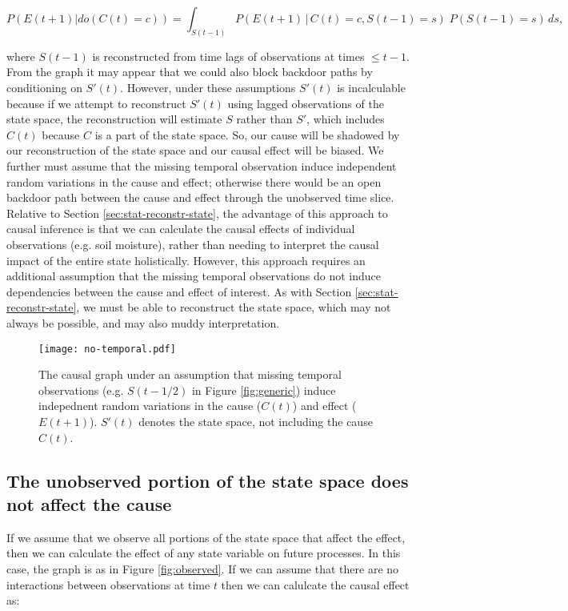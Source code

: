 \documentclass[12pt]{article}
\begin{document}
\begin{equation}
  P(E(t+1)| do(C(t)=c)) = \int_{S(t-1)} P(E(t+1) \, | \, C(t)=c,
  S(t-1) = s
  )\; P(S(t-1)=s) \, d s,
\end{equation}

where $S(t-1)$ is reconstructed from time lags of observations at
times $\leq t-1$. From the graph it may appear that we could also
block backdoor paths by conditioning on $S'(t)$. However, under these
assumptions $S'(t)$ is incalculable because if we attempt to
reconstruct $S'(t)$ using lagged observations of the state space, the
reconstruction will estimate $S$ rather than $S'$, which includes
$C(t)$ because $C$ is a part of the state space. So, our cause will be
shadowed by our reconstruction of the state space and our causal
effect will be biased. We further must assume that the missing
temporal observation induce independent random variations in the cause
and effect; otherwise there would be an open backdoor path between the
cause and effect through the unobserved time slice. Relative to
Section \ref{sec:stat-reconstr-state}, the advantage of this approach
to causal inference is that we can calculate the causal effects of
individual observations (e.g. soil moisture), rather than needing to
interpret the causal impact of the entire state holistically. However,
this approach requires an additional assumption that the missing
temporal observations do not induce dependencies between the cause and
effect of interest. As with Section \ref{sec:stat-reconstr-state}, we
must be able to reconstruct the state space, which may not always be
possible, and may also muddy interpretation.

\begin{figure}
  \texttt{[image: no-temporal.pdf]}
  \caption{The causal graph under an assumption that missing temporal
    observations (e.g. $S(t-1/2)$ in  Figure \ref{fig:generic}) induce
    indepednent random variations in the cause ($C(t)$) and effect
    ($E(t+1)$). $S'(t)$ denotes the state space, not including the
    cause $C(t)$.}
  \label{fig:no-temporal}
\end{figure}

\subsection{The unobserved portion of the state space does not affect
  the cause}
\label{sec:observ-port-state}

If we assume that we observe all portions of the state space that
affect the effect, then we can calculate the effect of any
state variable on future processes. In this case, the graph is as in
Figure \ref{fig:observed}. If we can assume that there are no
interactions between observations at time $t$ then we can calulcate
the causal effect as:
\end{document}
